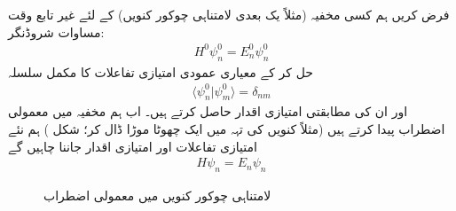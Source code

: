 

فرض کریں ہم کسی مخفیہ (مثلاً   یک  بعدی لامتناہی چوکور کنویں) کے لئے غیر تابع وقت مساوات شروڈنگر:
\begin{align}\label{مساوات_اضطراب_پہلی}
H^0\psi_n^0=E_n^0\psi_n^0
\end{align}
حل کر کے معیاری عمودی امتیازی تفاعلات  کا مکمل سلسلہ
\begin{align}
\langle \psi_n^0 | \psi_m^0 \rangle = \delta_{nm}
\end{align}
اور ان کی مطابقتی امتیازی اقدار  حاصل کرتے ہیں۔ اب ہم مخفیہ میں معمولی اضطراب پیدا کرتے ہیں (مثلاً کنویں کی تہہ میں ایک چھوٹا موڑا ڈال کر؛  شکل ) ہم  نئے  امتیازی تفاعلات اور امتیازی اقدار جاننا چاہیں گے
\begin{align}\label{مساوات_اضطراب_بنیادی}
H\psi_n = E_n\psi_n
\end{align}
%
\begin{figure}
\centering
{}
\caption{لامتناہی چوکور کنویں میں معمولی اضطراب}
\label{شکل_غیر_تابع_اضطراب_چکور_معمولی}
\end{figure}

